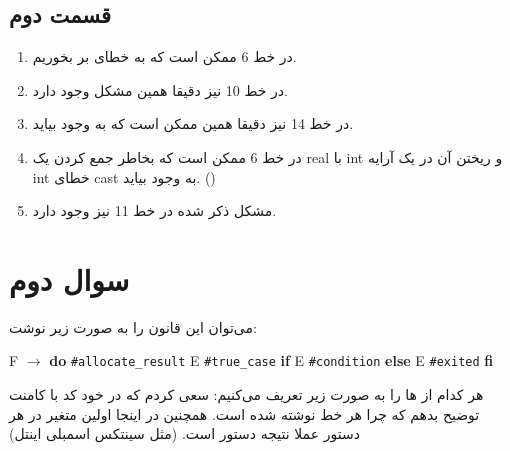\documentclass[]{article}
\begin{document}
\subsection*{قسمت دوم}
\begin{enumerate}
    \item در خط 6 ممکن است که به خطای  بر بخوریم.
    \item در خط 10 نیز دقیقا همین مشکل وجود دارد.
    \item در خط 14 نیز دقیقا همین  ممکن است که به وجود بیاید.
    \item در خط 6 ممکن است که بخاطر جمع کردن یک real با int و ریختن آن در یک آرایه int خطای cast به وجود بیاید. ()
    \item مشکل ذکر شده در خط 11 نیز وجود دارد.
\end{enumerate}
\section*{سوال دوم}
می‌توان این قانون را به صورت زیر نوشت:
\begin{latin}
    \centering
    F $\rightarrow$ \textbf{do} \texttt{\#allocate\_result} E \texttt{\#true\_case} \textbf{if} E \texttt{\#condition} \textbf{else} E \texttt{\#exited} \textbf{fi}
\end{latin}
هر کدام از
ها
را به صورت زیر تعریف می‌کنیم:
سعی کردم که در خود کد با کامنت توضیح بدهم که چرا هر خط نوشته شده است. همچنین در اینجا اولین
متغیر در هر دستور عملا نتیجه دستور است. (مثل سینتکس اسمبلی اینتل)
\end{document}
